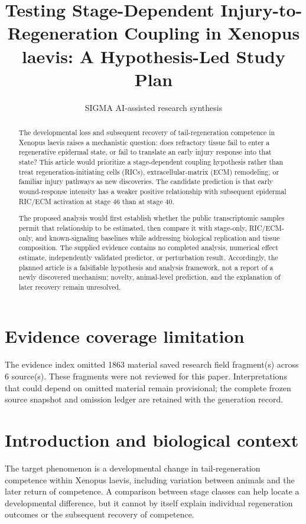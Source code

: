 \documentclass[11pt]{article}
\title{Testing Stage-Dependent Injury-to-Regeneration Coupling in Xenopus laevis: A Hypothesis-Led Study Plan}
\date{}
\author{SIGMA AI-assisted research synthesis}
\begin{document}
\maketitle

\begin{abstract}
The developmental loss and subsequent recovery of tail-regeneration competence in Xenopus laevis raises a mechanistic question: does refractory tissue fail to enter a regenerative epidermal state, or fail to translate an early injury response into that state? This article would prioritize a stage-dependent coupling hypothesis rather than treat regeneration-initiating cells (RICs), extracellular-matrix (ECM) remodeling, or familiar injury pathways as new discoveries. The candidate prediction is that early wound-response intensity has a weaker positive relationship with subsequent epidermal RIC/ECM activation at stage 46 than at stage 40.

The proposed analysis would first establish whether the public transcriptomic samples permit that relationship to be estimated, then compare it with stage-only, RIC/ECM-only, and known-signaling baselines while addressing biological replication and tissue composition. The supplied evidence contains no completed analysis, numerical effect estimate, independently validated predictor, or perturbation result. Accordingly, the planned article is a falsifiable hypothesis and analysis framework, not a report of a newly discovered mechanism; novelty, animal-level prediction, and the explanation of later recovery remain unresolved.
\end{abstract}
\section*{Evidence coverage limitation}
The evidence index omitted 1863 material saved research field fragment(s) across 6 source(s). These fragments were not reviewed for this paper. Interpretations that could depend on omitted material remain provisional; the complete frozen source snapshot and omission ledger are retained with the generation record.
\section{Introduction and biological context}
The target phenomenon is a developmental change in tail-regeneration competence within Xenopus laevis, including variation between animals and the later return of competence. A comparison between stage classes can help locate a developmental difference, but it cannot by itself explain individual regeneration outcomes or the subsequent recovery of competence.
\end{document}
